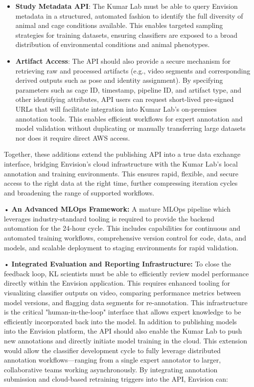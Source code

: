 \documentclass[11pt,onecolumn]{article}
\begin{document}
\begin{itemize}
    \item \textbf{Study Metadata API}: The Kumar Lab must be able to query Envision metadata in a structured, automated fashion to identify the full diversity of animal and cage conditions available. This enables targeted sampling strategies for training datasets, ensuring classifiers are exposed to a broad distribution of environmental conditions and animal phenotypes. 
    
    \item \textbf{Artifact Access}: The API should also provide a secure mechanism for retrieving raw and processed artifacts (e.g., video segments and corresponding derived outputs such as pose and identity assignment). By specifying parameters such as cage ID, timestamp, pipeline ID, and artifact type, and other identifying attributes, API users can request short-lived pre-signed URLs that will facilitate integration into Kumar Lab's on-premises annotation tools. This enables efficient workflows for expert annotation and model validation without duplicating or manually transferring large datasets nor does it require direct AWS access.

\end{itemize}Together, these additions extend the publishing API into a true data exchange interface, bridging Envision's cloud infrastructure with the Kumar Lab's local annotation and training environments. This ensures rapid, flexible, and secure access to the right data at the right time, further compressing iteration cycles and broadening the range of supported workflows.

•\textbf{ An Advanced MLOps Framework:} A mature MLOps pipeline which leverages industry-standard tooling is required to provide the backend automation for the 24-hour cycle. This includes capabilities for continuous and automated training workflows, comprehensive version control for code, data, and models, and scalable deployment to staging environments for rapid validation.

•\textbf{ Integrated Evaluation and Reporting Infrastructure:} To close the feedback loop, KL scientists must be able to efficiently review model performance directly within the Envision application. This requires enhanced tooling for visualizing classifier outputs on video, comparing performance metrics between model versions, and flagging data segments for re-annotation. This infrastructure is the critical "human-in-the-loop" interface that allows expert knowledge to be efficiently incorporated back into the model. In addition to publishing models into the Envision platform, the API should also enable the Kumar Lab to push new annotations and directly initiate model training in the cloud. This extension would allow the classifier development cycle to fully leverage distributed annotation workflows—ranging from a single expert annotator to larger, collaborative teams working asynchronously. By integrating annotation submission and cloud-based retraining triggers into the API, Envision can:
\end{document}
